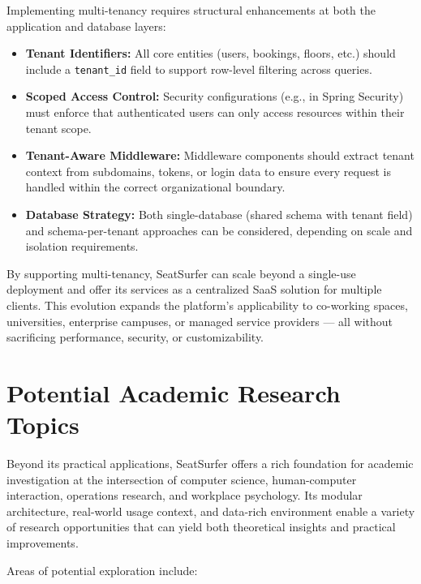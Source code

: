 \documentclass[12pt,a4paper]{report}
\begin{document}
Implementing multi-tenancy requires structural enhancements at both the application and database layers:

\begin{itemize}
\item \textbf{Tenant Identifiers:}
All core entities (users, bookings, floors, etc.) should include a \texttt{tenant\_id} field to support row-level filtering across queries.
\item \textbf{Scoped Access Control:}  
Security configurations (e.g., in Spring Security) must enforce that authenticated users can only access resources within their tenant scope.
\item \textbf{Tenant-Aware Middleware:}  
Middleware components should extract tenant context from subdomains, tokens, or login data to ensure every request is handled within the correct organizational boundary.
\item \textbf{Database Strategy:}  
Both single-database (shared schema with tenant field) and schema-per-tenant approaches can be considered, depending on scale and isolation requirements.
\end{itemize}

By supporting multi-tenancy, SeatSurfer can scale beyond a single-use deployment and offer its services as a centralized SaaS solution for multiple clients. This evolution expands the platform's applicability to co-working spaces, universities, enterprise campuses, or managed service providers — all without sacrificing performance, security, or customizability.

\section{Potential Academic Research Topics}

Beyond its practical applications, SeatSurfer offers a rich foundation for academic investigation at the intersection of computer science, human-computer interaction, operations research, and workplace psychology. Its modular architecture, real-world usage context, and data-rich environment enable a variety of research opportunities that can yield both theoretical insights and practical improvements.

Areas of potential exploration include:
\end{document}
